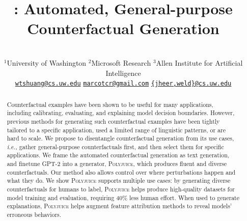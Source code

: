 \documentclass[11pt,a4paper]{article}
\title{\sysname: Automated, General-purpose Counterfactual Generation}
\author{
\makecell{
Tongshuang Wu$^{1}$ ~~~~~~~ 
Marco Tulio Ribeiro$^{2}$ ~~~~~~~ 
Jeffrey Heer$^{1}$ ~~~~~ 
Daniel S. Weld$^{1,3}$}  \\ 
$^{1}$University of Washington\hspace{5mm}
$^{2}$Microsoft Research\hspace{5mm} 
$^{3}$Allen Institute for Artificial Intelligence\hspace{5mm}\\
\hspace{-5mm}
\href{mailto:wtshuang@cs.uw.edu}{\texttt {wtshuang@cs.uw.edu}}
\hspace{5mm}
\href{mailto:marcotcr@microsoft.com}{\texttt {marcotcr@gmail.com}}
\hspace{10mm}
\href{mailto:dan@cs.washington.edu}{\texttt {\{jheer,weld\}@cs.uw.edu}}
}
\date{}
\newcommand{\sysname}{\textsc{Polyjuice}\xspace}
\newcommand{\ie}{\emph{i.e.,}\xspace}
\begin{document}
\maketitle
\begin{abstract}
Counterfactual examples have been shown to be useful for many applications, including calibrating, evaluating, and explaining model decision boundaries. However, previous methods for generating such counterfactual examples have been tightly tailored to a specific application, used  a limited range of linguistic patterns, or are hard to scale. 
We propose to disentangle counterfactual generation from its use cases, \ie gather general-purpose counterfactuals first, and then select them for specific applications. 
We frame the automated counterfactual generation as text generation, and finetune GPT-2 into a generator, \sysname, which produces fluent and diverse counterfactuals. 
Our method also allows control over where perturbations happen and what they do. 
We show \sysname supports multiple use cases: by generating diverse counterfactuals for humans to label, \sysname helps produce high-quality datasets for model training and evaluation, requiring 40\% less human effort. 
When used to generate explanations, \sysname helps augment feature attribution methods to reveal models' erroneous behaviors.
\end{abstract}


%












\clearpage
\newpage

\appendix

%





\balance

\end{document}
